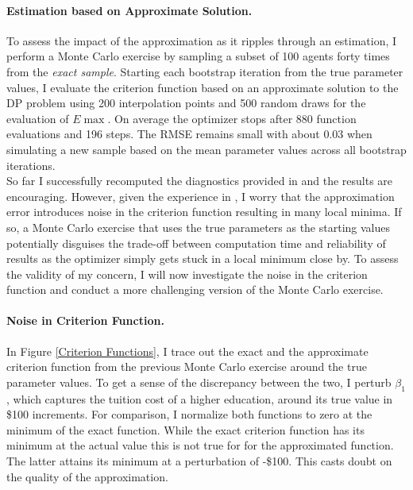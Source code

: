 \paragraph{Estimation based on Approximate Solution.}
To assess the impact of the approximation as it ripples through an estimation, I perform a Monte Carlo exercise by sampling a subset of 100 agents forty times from the \textit{exact sample}. Starting each  bootstrap iteration from the true parameter values, I evaluate the criterion function based on an approximate solution to the DP problem using 200 interpolation points and 500 random draws for the evaluation of $E\max$. On average the optimizer stops after 880 function evaluations and 196 steps. The RMSE remains small with about 0.03 when simulating a new sample based on the mean parameter values across all bootstrap iterations. \\\newline
%
So far I successfully recomputed the diagnostics provided in \citet{Keane.1994} and the results are encouraging. However, given the experience in \citet{Eisenhauer.2015b}, I worry that the approximation error introduces noise in the criterion function resulting in many local minima. If so, a Monte Carlo exercise that uses the true parameters as the starting values potentially disguises the trade-off between computation time and reliability of results as the optimizer simply gets stuck in a local minimum close by. To assess the validity of my concern, I will now investigate the noise in the criterion function and conduct a more challenging version of the Monte Carlo exercise.
\paragraph{Noise in Criterion Function.}
In Figure \ref{Criterion Functions}, I trace out the exact and the approximate criterion function from the previous Monte Carlo exercise around the true parameter values. To get a sense of the discrepancy between the two, I perturb $\beta_1$, which captures the tuition cost of a higher education, around its true value in \$100 increments. For comparison, I normalize both functions to zero at the minimum of the exact function. While the exact criterion function has its minimum at the actual value this is not true for for the approximated function. The latter attains its minimum at a perturbation of -\$100. This casts doubt on the quality of the approximation.

